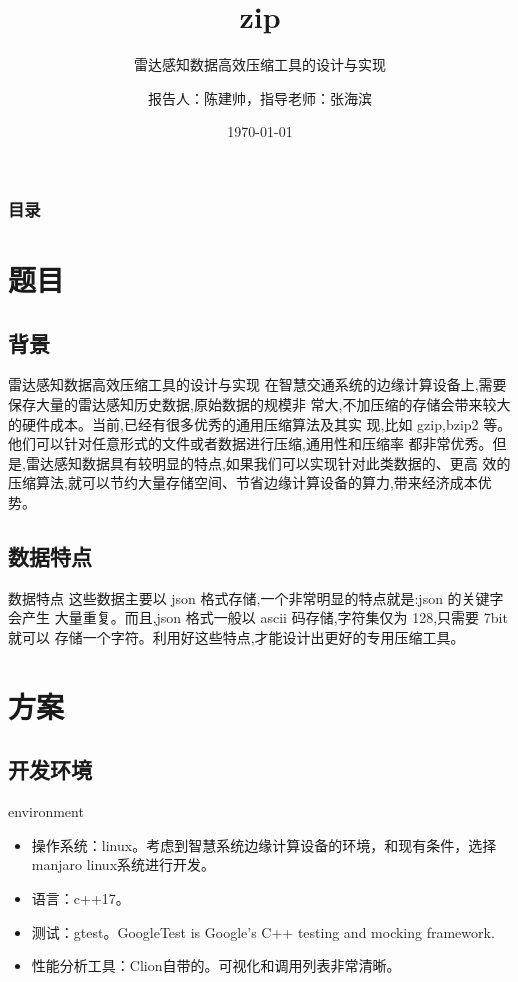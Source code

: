 \documentclass[10pt]{ctexbeamer}
\title{zip}
\subtitle{雷达感知数据高效压缩工具的设计与实现}
\date{\today}
\author{报告人：陈建帅，指导老师：张海滨}
\institute{BUPT}
\begin{document}


\begin{frame}           %
    \addtocounter{framenumber}{-2}%
    \frametitle{目录}
    \thispagestyle{empty}
    \tableofcontents        %
\end{frame}

\section{题目}
\subsection{背景}
\begin{frame}{雷达感知数据高效压缩工具的设计与实现}
  在智慧交通系统的边缘计算设备上,需要保存大量的雷达感知历史数据,原始数据的规模非
常大,不加压缩的存储会带来较大的硬件成本。当前,已经有很多优秀的通用压缩算法及其实
现,比如 gzip,bzip2 等。他们可以针对任意形式的文件或者数据进行压缩,通用性和压缩率
都非常优秀。但是,雷达感知数据具有较明显的特点,如果我们可以实现针对此类数据的、更高
效的压缩算法,就可以节约大量存储空间、节省边缘计算设备的算力,带来经济成本优势。
\end{frame}
\subsection{数据特点}
\begin{frame}{数据特点}
  这些数据主要以 json 格式存储,一个非常明显的特点就是:json 的关键字会产生
大量重复。而且,json 格式一般以 ascii 码存储,字符集仅为 128,只需要 7bit 就可以
存储一个字符。利用好这些特点,才能设计出更好的专用压缩工具。
\end{frame}
\section{方案}
\subsection{开发环境}
\begin{frame}{environment}
  \begin{itemize}
    \item 操作系统：linux。考虑到智慧系统边缘计算设备的环境，和现有条件，选择manjaro linux系统进行开发。
    \item 语言：c++17。
    \item 测试：gtest。GoogleTest is Google’s C++ testing and mocking framework. 
    \item 性能分析工具：Clion自带的。可视化和调用列表非常清晰。
  \end{itemize}
\end{frame}
\end{document}
